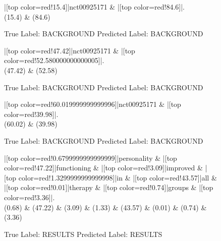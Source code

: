 \documentclass[a4paper, landscape]{article}
\begin{document}
\clearpage
\begin{figure}
\begin{center}
\begin{dependency}
\begin{deptext}
|[top color=red!15.4]|nct00925171 \& |[top color=red!84.6]|.\\
(15.4) \& (84.6)\\
\end{deptext}
\end{dependency}
\end{center}
\caption{True Label: BACKGROUND Predicted Label: BACKGROUND}
\end{figure}
\clearpage
\begin{figure}
\begin{center}
\begin{dependency}
\begin{deptext}
|[top color=red!47.42]|nct00925171 \& |[top color=red!52.580000000000005]|.\\
(47.42) \& (52.58)\\
\end{deptext}
\end{dependency}
\end{center}
\caption{True Label: BACKGROUND Predicted Label: BACKGROUND}
\end{figure}
\clearpage
\begin{figure}
\begin{center}
\begin{dependency}
\begin{deptext}
|[top color=red!60.019999999999996]|nct00925171 \& |[top color=red!39.98]|.\\
(60.02) \& (39.98)\\
\end{deptext}
\end{dependency}
\end{center}
\caption{True Label: BACKGROUND Predicted Label: BACKGROUND}
\end{figure}
\clearpage
\begin{figure}
\begin{center}
\begin{dependency}
\begin{deptext}
|[top color=red!0.6799999999999999]|personality \& |[top color=red!47.22]|functioning \& |[top color=red!3.09]|improved \& |[top color=red!1.3299999999999998]|in \& |[top color=red!43.57]|all \& |[top color=red!0.01]|therapy \& |[top color=red!0.74]|groups \& |[top color=red!3.36]|.\\
(0.68) \& (47.22) \& (3.09) \& (1.33) \& (43.57) \& (0.01) \& (0.74) \& (3.36)\\
\end{deptext}
\end{dependency}
\end{center}
\caption{True Label: RESULTS Predicted Label: RESULTS}
\end{figure}
\end{document}
